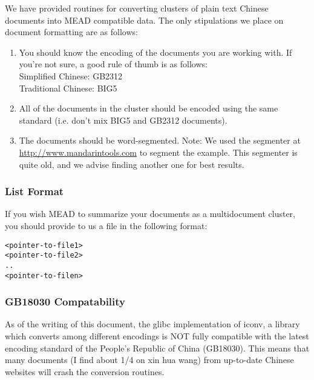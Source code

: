 \documentclass[10pt]{article}
\begin{document}
We have provided routines for converting clusters of plain text
Chinese documents into MEAD compatible data.  The only stipulations we
place on document formatting are as follows:

\begin{enumerate}

\item You should know the encoding of the documents you are working
   with.  If you're not sure, a good rule of thumb is as follows:\\

   Simplified Chinese: GB2312 \\

   Traditional Chinese: BIG5

\item All of the documents in the cluster should be encoded using the
   same standard (i.e. don't mix BIG5 and GB2312 documents).

\item The documents should be word-segmented. Note: We used the segmenter
   at \url{http://www.mandarintools.com} to segment the example.  This
   segmenter is quite old, and we advise finding another one for best
   results.

\end{enumerate}

\subsubsection{List Format}

If you wish MEAD to summarize your documents as a multidocument
cluster, you should provide to us a file in the following format:

\begin{verbatim}
<pointer-to-file1>
<pointer-to-file2>
..
<pointer-to-filen>
\end{verbatim}

\subsubsection{GB18030 Compatability}

As of the writing of this document, the glibc implementation of iconv,
a library which converts among different encodings is NOT fully
compatible with the latest encoding standard of the People's Republic
of China (GB18030).  This means that many documents (I find about 1/4
on xin hua wang) from up-to-date Chinese websites will crash the
conversion routines.
\end{document}
